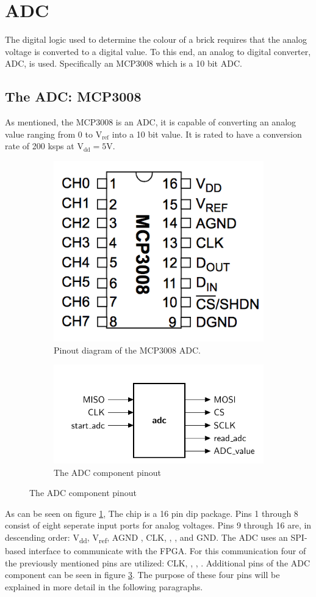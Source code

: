\section{ADC}
The digital logic used to determine the colour of a brick requires that the analog voltage is converted to a digital value. To this end, an analog to digital converter, ADC, is used. Specifically an MCP3008 \cite{mcp3008} which is a 10 bit ADC.
\subsection{The ADC: MCP3008}
As mentioned, the MCP3008 is an ADC, it is capable of converting an analog value ranging from 0 to V$_{\text{ref}}$ into a 10 bit value. It is rated to have a conversion rate of 200 ksps at V$_{\text{dd}} = 5$V. 

\begin{figure}[h!]
	\begin{subfigure}[b]{.48\linewidth}
		\centering
		\includegraphics[width=.5\linewidth]{images/MPC3008.png}
		\caption{Pinout diagram of the MCP3008 ADC.}
		\label{fig:pinout}
	\end{subfigure}
	\begin{subfigure}[b]{.48\linewidth}
		\centering
		\includegraphics[width=\linewidth]{images/ADC_ent}
		\caption{The ADC component pinout}
		\label{fig:adcpinout}
	\end{subfigure}
\end{figure}
As can be seen on figure \ref{fig:pinout}, The chip is a 16 pin dip package. Pins 1 through 8 consist of eight seperate input ports for analog voltages. Pins 9 through 16 are, in descending order: V\textsubscript{dd}, V\textsubscript{ref}, AGND , CLK, \dout,  \din, \cs and GND. 
The ADC uses an SPI-based interface to communicate with the FPGA. 
For this communication four of the previously mentioned pins are utilized: CLK, \cs, \dout, \din. Additional pins of the ADC component can be seen in figure \ref{fig:adcpinout}. 
The purpose of these four pins will be explained in more detail in the following paragraphs.


